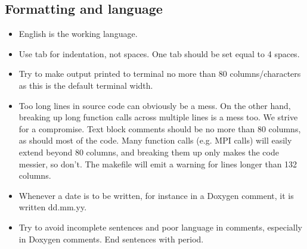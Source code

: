 \documentclass[10pt,a4paper]{article}
\begin{document}
\subsection{Formatting and language}

\begin{itemize}
	\item English is the working language.
	\item Use tab for indentation, not spaces. One tab should be set equal to 4 spaces.
	\item Try to make output printed to terminal no more than 80 columns/characters as this is the default terminal width.
	\item Too long lines in source code can obviously be a mess. On the other hand, breaking up long function calls across multiple lines
	is a mess too. We strive for a compromise. Text block comments should be no more than 80 columns, as should most of the code. Many
	function calls (e.g. MPI calls) will easily extend beyond 80 columns, and breaking them up only makes the code messier, so don't. The
	makefile will emit a warning for lines longer than 132 columns.
	\item Whenever a date is to be written, for instance in a Doxygen comment, it is written dd.mm.yy.
	\item Try to avoid incomplete sentences and poor language in comments, especially in Doxygen comments. End sentences with period.
\end{itemize}
\end{document}
